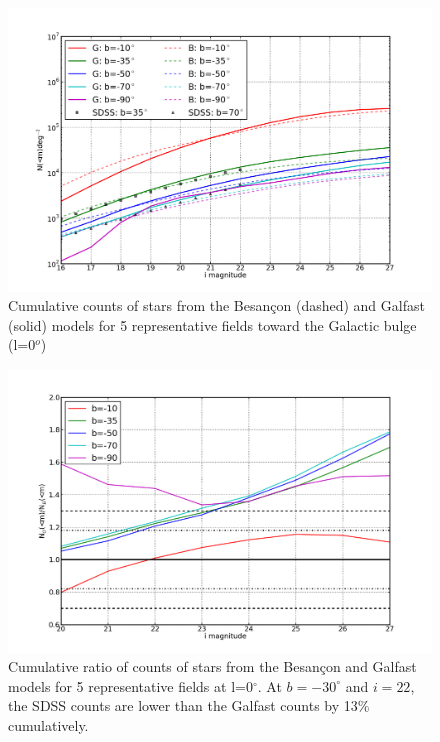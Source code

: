 \documentclass[]{article}
\begin{document}


\begin{figure}[h]
\centering
\includegraphics[width=5in]{validation_figures/cumulative_stars_90_besancon_dust.png}
\caption{Cumulative counts of stars from the Besan\c{c}on (dashed) and Galfast (solid) models for 5 representative fields toward the Galactic bulge (l=0$^o$) \label{fig:scounts_0}}
\end{figure}

\begin{figure}[h]
\centering
\includegraphics[width=5in]{validation_figures/cumulative_ratio_stars_90_besancon_dust.png}
\caption{Cumulative ratio of counts of stars from the Besan\c{c}on and Galfast models for 5 representative fields at l=0$^{\circ}$.  At $b=-30^{\circ}$ and $i=22$, the SDSS counts are lower than the Galfast counts by 13\% cumulatively.\label{fig:sratio_90}}
\end{figure}
\end{document}
